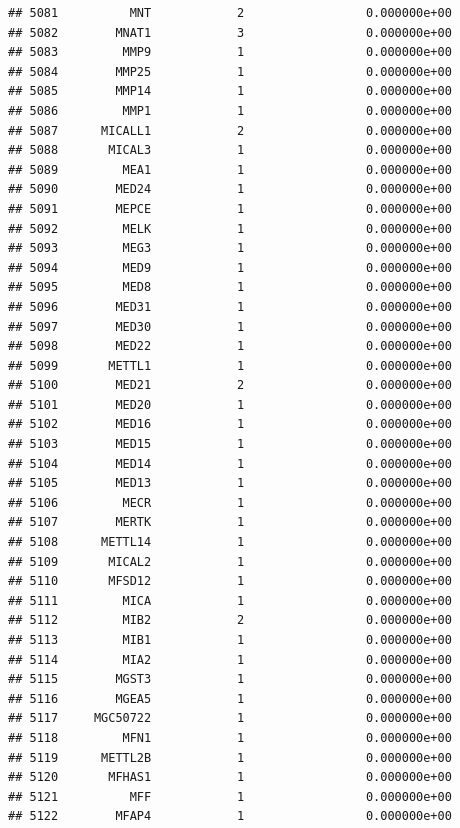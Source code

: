 \documentclass[
]{article}
\begin{document}
\begin{verbatim}
## 5081          MNT            2                 0.000000e+00
## 5082        MNAT1            3                 0.000000e+00
## 5083         MMP9            1                 0.000000e+00
## 5084        MMP25            1                 0.000000e+00
## 5085        MMP14            1                 0.000000e+00
## 5086         MMP1            1                 0.000000e+00
## 5087      MICALL1            2                 0.000000e+00
## 5088       MICAL3            1                 0.000000e+00
## 5089         MEA1            1                 0.000000e+00
## 5090        MED24            1                 0.000000e+00
## 5091        MEPCE            1                 0.000000e+00
## 5092         MELK            1                 0.000000e+00
## 5093         MEG3            1                 0.000000e+00
## 5094         MED9            1                 0.000000e+00
## 5095         MED8            1                 0.000000e+00
## 5096        MED31            1                 0.000000e+00
## 5097        MED30            1                 0.000000e+00
## 5098        MED22            1                 0.000000e+00
## 5099       METTL1            1                 0.000000e+00
## 5100        MED21            2                 0.000000e+00
## 5101        MED20            1                 0.000000e+00
## 5102        MED16            1                 0.000000e+00
## 5103        MED15            1                 0.000000e+00
## 5104        MED14            1                 0.000000e+00
## 5105        MED13            1                 0.000000e+00
## 5106         MECR            1                 0.000000e+00
## 5107        MERTK            1                 0.000000e+00
## 5108      METTL14            1                 0.000000e+00
## 5109       MICAL2            1                 0.000000e+00
## 5110       MFSD12            1                 0.000000e+00
## 5111         MICA            1                 0.000000e+00
## 5112         MIB2            2                 0.000000e+00
## 5113         MIB1            1                 0.000000e+00
## 5114         MIA2            1                 0.000000e+00
## 5115        MGST3            1                 0.000000e+00
## 5116        MGEA5            1                 0.000000e+00
## 5117     MGC50722            1                 0.000000e+00
## 5118         MFN1            1                 0.000000e+00
## 5119      METTL2B            1                 0.000000e+00
## 5120       MFHAS1            1                 0.000000e+00
## 5121          MFF            1                 0.000000e+00
## 5122        MFAP4            1                 0.000000e+00

\end{verbatim}
\end{document}
